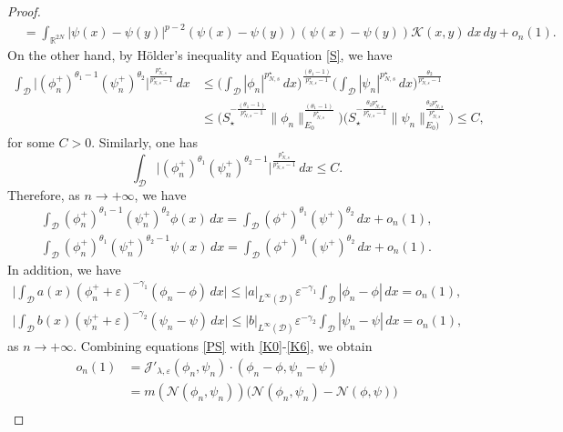 \documentclass[10pt,a4paper]{amsart}
\numberwithin{equation}{section}
\begin{document}
\begin{proof}
\begin{equation}
\begin{aligned}
&= \int_{\mathbb{R}^{2N}}|\psi(x)-\psi(y)|^{p-2}(\psi(x)
 -\psi(y))(\psi(x)-\psi(y))\mathcal{K}(x,y)\,dx\,dy+o_n(1).
\end{aligned}
\end{equation}
On the other hand, by H\"older's inequality and Equation \eqref{S}, we have
\begin{align*}
\int_\mathcal{D}\Big|( \phi^+_n)^{\theta_1-1} (\psi^+_n)^{\theta_2}
 \Big|^\frac{p^\star_{N,s}}{p^\star_{N,s}-1}\,dx
&\leq \Big(\int_\mathcal{D}|\phi_n|^{{p^\star_{N,s}}}\,dx
 \Big)^\frac{(\theta_1-1)}{p^\star_{N,s}-1}\Big(\int_\mathcal{D}
 |\psi_n|^{{p^\star_{N,s}}}\,dx\Big)^\frac{\theta_2 }{p^\star_{N,s}-1}\\
&\leq \Big(S_\star^{-\frac{(\theta_1-1)}{p^\star_{N,s}-1}}\|
 \phi_n\|_{E_0}^\frac{(\theta_1-1)}{p^\star_{N,s}}\Big)
 \Big(S_\star^{-\frac{\theta_2p^\star_{N,s}}{p^\star_{N,s}-1}}
 \| \psi_n\|_{E_0)}^\frac{\theta_2p^\star_{N,s}}{p^\star_{N,s}}\Big)
\leq  C,
\end{align*}
for some $C>0$. Similarly, one has
\[
\int_\mathcal{D}\Big|(\phi^+_n)^{\theta_1}( \psi^+_n)^{\theta_2-1}
\Big|^\frac{p^\star_{N,s}}{p^\star_{N,s}-1}\,dx\leq C.
\]
Therefore, as $n\to +\infty$, we have
\begin{gather}\label{K3}
\int_\mathcal{D} ( \phi^+_n)^{\theta_1-1} (\psi^+_n)^{\theta_2}\phi(x)\,dx
=\int_\mathcal{D} ( \phi^+)^{\theta_1} (\psi^+)^{\theta_2}\,dx+o_n(1), \\
\label{K4}
\int_\mathcal{D} ( \phi^+_n)^{\theta_1} (\psi^+_n)^{\theta_2-1}\psi(x)\,dx
=\int_\mathcal{D} ( \phi^+)^{\theta_1} (\psi^+)^{\theta_2}\,dx+o_n(1).
\end{gather}
In addition, we have
\begin{gather}\label{K5}
\Big|\int_\mathcal{D}a(x)(\phi_n^++\varepsilon)^{-\gamma_1}(\phi_n-\phi)\,dx \Big|
\leq |a|_{L^\infty(\mathcal{D})}\varepsilon^{-\gamma_1} \int_\mathcal{D}|\phi_n
 -\phi|\,dx  =o_n(1), \\
\label{K6}
\Big|\int_\mathcal{D}b(x)(\psi_n^++\varepsilon)^{-\gamma_2}(\psi_n-\psi)\,dx \Big|
\leq |b|_{L^\infty(\mathcal{D})}\varepsilon^{-\gamma_2} \int_\mathcal{D}|\psi_n
 -\psi|\,dx =o_n(1),
\end{gather}
as $n\to +\infty$.
Combining equations \eqref{PS} with \eqref{K0}-\eqref{K6}, we obtain
\begin{align*}
o_n(1)
&=\mathcal{J}'_{\lambda,\varepsilon}(\phi_n,\psi_n)\cdot(\phi_n-\phi,\psi_n-\psi)\\
&=m(\mathcal{N}(\phi_n,\psi_n))\Big(\mathcal{N}(\phi_n,\psi_n)-\mathcal{N}
 (\phi,\psi)\Big)\\

\end{align*}
\end{proof}
\end{document}
